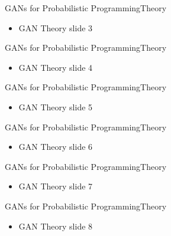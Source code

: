 \documentclass[AERbeamer%
              ,optEnglish%
              ,optBiber%
              ,optBibstyleAlphabetic%
              ,optBeamerClassicFormat%
              ]{AERlatex}%
\begin{document}
\begin{frame}[c]{GANs for Probabilistic Programming}{Theory}
    \centering
    \begin{itemize}
        \item GAN Theory slide 3
    \end{itemize}
\end{frame}


\begin{frame}[c]{GANs for Probabilistic Programming}{Theory}
    \centering
    \begin{itemize}
        \item GAN Theory slide 4
    \end{itemize}
\end{frame}


\begin{frame}[c]{GANs for Probabilistic Programming}{Theory}
    \centering
    \begin{itemize}
        \item GAN Theory slide 5
    \end{itemize}
\end{frame}


\begin{frame}[c]{GANs for Probabilistic Programming}{Theory}
    \centering
    \begin{itemize}
        \item GAN Theory slide 6
    \end{itemize}
\end{frame}


\begin{frame}[c]{GANs for Probabilistic Programming}{Theory}
    \centering
    \begin{itemize}
        \item GAN Theory slide 7
    \end{itemize}
\end{frame}


\begin{frame}[c]{GANs for Probabilistic Programming}{Theory}
    \centering
    \begin{itemize}
        \item GAN Theory slide 8
    \end{itemize}
\end{frame}
\end{document}
